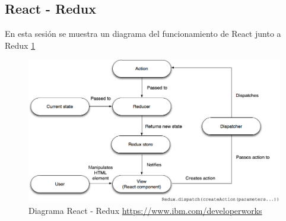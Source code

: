 \subsection {React - Redux}
En esta sesión se muestra un diagrama del funcionamiento de React junto a Redux \ref{fig:react_redux}
\begin{figure}
  \begin{center}
    \includegraphics[width=\textwidth]{imagenes/react_redux.png}
    \caption{Diagrama React - Redux \url{https://www.ibm.com/developerworks}}
    \label{fig:react_redux}
  \end{center}
\end{figure}


  
